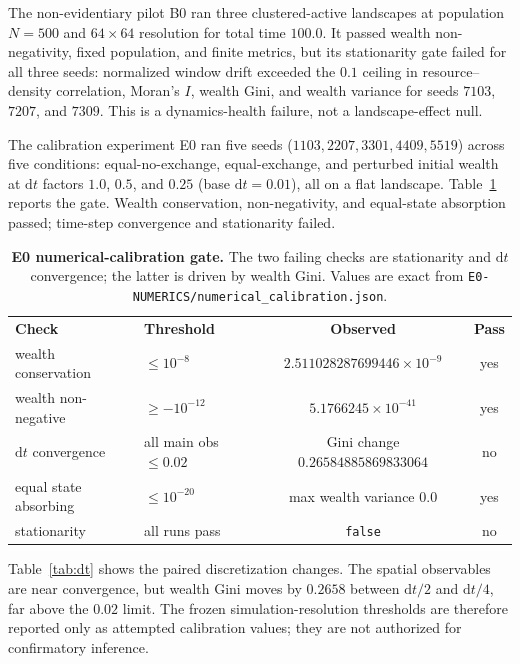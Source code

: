 \documentclass[aps,prl,reprint,superscriptaddress,amsmath,amssymb]{revtex4-2}
\begin{document}
The non-evidentiary pilot B0 ran three clustered-active landscapes at population $N=500$ and $64\times64$ resolution for total time $100.0$. It passed wealth non-negativity, fixed population, and finite metrics, but its stationarity gate failed for all three seeds: normalized window drift exceeded the $0.1$ ceiling in resource--density correlation, Moran's $I$, wealth Gini, and wealth variance for seeds $7103$, $7207$, and $7309$. This is a dynamics-health failure, not a landscape-effect null.

The calibration experiment E0 ran five seeds ($1103,2207,3301,4409,5519$) across five conditions: equal-no-exchange, equal-exchange, and perturbed initial wealth at $\mathrm{d}t$ factors $1.0$, $0.5$, and $0.25$ (base $\mathrm{d}t=0.01$), all on a flat landscape. Table~\ref{tab:e0gate} reports the gate. Wealth conservation, non-negativity, and equal-state absorption passed; time-step convergence and stationarity failed.

\begin{table}[htbp]
\caption{\textbf{E0 numerical-calibration gate.} The two failing checks are stationarity and $\mathrm{d}t$ convergence; the latter is driven by wealth Gini. Values are exact from \texttt{E0-NUMERICS/numerical\_calibration.json}.}
\label{tab:e0gate}
\begin{ruledtabular}
\begin{tabular}{llcc}
\textbf{Check} & \textbf{Threshold} & \textbf{Observed} & \textbf{Pass}\\
wealth conservation & $\le10^{-8}$ & $2.511028287699446\times10^{-9}$ & yes\\
wealth non-negative & $\ge-10^{-12}$ & $5.1766245\times10^{-41}$ & yes\\
$\mathrm{d}t$ convergence & all main obs $\le0.02$ & Gini change $0.26584885869833064$ & no\\
equal state absorbing & $\le10^{-20}$ & max wealth variance $0.0$ & yes\\
stationarity & all runs pass & \texttt{false} & no\\
\end{tabular}
\end{ruledtabular}
\end{table}

Table~\ref{tab:dt} shows the paired discretization changes. The spatial observables are near convergence, but wealth Gini moves by $0.2658$ between $\mathrm{d}t/2$ and $\mathrm{d}t/4$, far above the $0.02$ limit. The frozen simulation-resolution thresholds are therefore reported only as attempted calibration values; they are not authorized for confirmatory inference.
\end{document}
